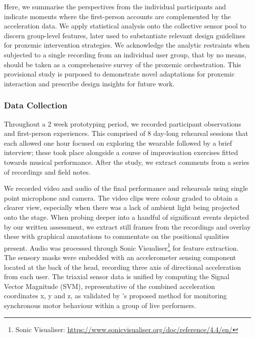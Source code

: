 Here, we summarise the perspectives from the individual participants and indicate moments where the first-person accounts are complemented by the acceleration data. We apply statistical analysis onto the collective sensor pool to discern group-level features, later used to substantiate relevant design guidelines for proxemic intervention strategies. We acknowledge the analytic restraints when subjected to a single recording from an individual user group, that by no means, should be taken as a comprehensive survey of the proxemic orchestration. This provisional study is purposed to demonstrate novel adaptations for proxemic interaction and prescribe design insights for future work.


\subsubsection{Data Collection}
\label{sec:data_collection}

Throughout a 2 week prototyping period, we recorded participant observations and first-person experiences. This comprised of 8 day-long rehearsal sessions that each allowed one hour focused on exploring the wearable followed by a brief interview; these took place alongside a course of improvisation exercises fitted towards musical performance. After the study, we extract comments from a series of recordings and field notes.

We recorded video and audio of the final performance and rehearsals using single point microphone and camera. The video clips were colour graded to obtain a clearer view, especially when there was a lack of ambient light being projected onto the stage. When probing deeper into a handful of significant events depicted by our written assessment, we extract still frames from the recordings and overlay these with graphical annotations to commentate on the positional qualities present. Audio was processed through Sonic Visualiser\footnote{Sonic Visualiser: \url{https://www.sonicvisualiser.org/doc/reference/4.4/en/}} for feature extraction. The sensory masks were embedded with an accelerometer sensing component located at the back of the head, recording three axis of directional acceleration from each user. The triaxial sensor data is unified by computing the Signal Vector Magnitude (SVM), representative of the combined acceleration coordinates x, y and z, as validated by \citeauthor{ward_sensing_2018}'s \citeyear{ward_sensing_2018} proposed method for monitoring synchronous motor behaviour within a group of live performers. 

